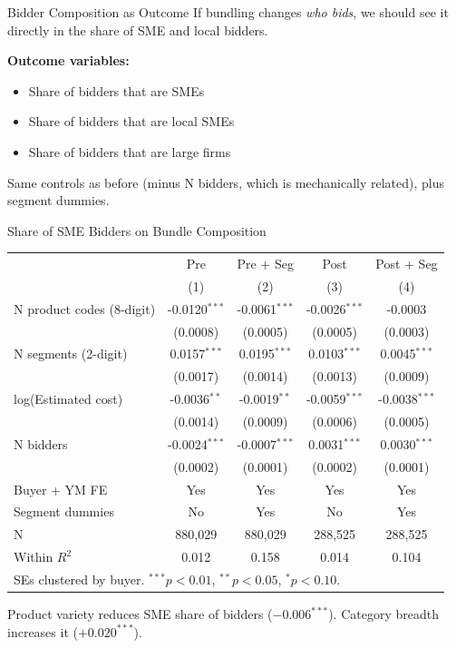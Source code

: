 \documentclass[9pt,aspectratio=169]{beamer}
\begin{document}
\begin{frame}{Bidder Composition as Outcome}
If bundling changes \textit{who bids}, we should see it directly in the share of SME and local bidders.

\bigskip
\textbf{Outcome variables:}
\begin{itemize}
  \item Share of bidders that are SMEs
  \item Share of bidders that are local SMEs
  \item Share of bidders that are large firms
\end{itemize}

\medskip
Same controls as before (minus N bidders, which is mechanically related), plus segment dummies.
\end{frame}

\begin{frame}{Share of SME Bidders on Bundle Composition}
\centering\small
\begin{tabular}{lcccc}
\toprule
 & Pre & Pre + Seg & Post & Post + Seg \\
 & (1) & (2) & (3) & (4) \\
\midrule
N product codes (8-digit) & -0.0120$^{***}$ & -0.0061$^{***}$ & -0.0026$^{***}$ & -0.0003 \\
 & (0.0008) & (0.0005) & (0.0005) & (0.0003) \\[2pt]
N segments (2-digit) & 0.0157$^{***}$ & 0.0195$^{***}$ & 0.0103$^{***}$ & 0.0045$^{***}$ \\
 & (0.0017) & (0.0014) & (0.0013) & (0.0009) \\[2pt]
log(Estimated cost) & -0.0036$^{**}$ & -0.0019$^{**}$ & -0.0059$^{***}$ & -0.0038$^{***}$ \\
 & (0.0014) & (0.0009) & (0.0006) & (0.0005) \\[2pt]
N bidders & -0.0024$^{***}$ & -0.0007$^{***}$ & 0.0031$^{***}$ & 0.0030$^{***}$ \\
 & (0.0002) & (0.0001) & (0.0002) & (0.0001) \\[2pt]
\midrule
Buyer + YM FE & Yes & Yes & Yes & Yes \\
Segment dummies & No & Yes & No & Yes \\
N & 880,029 & 880,029 & 288,525 & 288,525 \\
Within $R^2$ & 0.012 & 0.158 & 0.014 & 0.104 \\
\bottomrule
\multicolumn{5}{l}{\footnotesize SEs clustered by buyer. $^{***}p<0.01$, $^{**}p<0.05$, $^{*}p<0.10$.} \\
\end{tabular}

\medskip
\small Product variety reduces SME share of bidders ($-0.006^{***}$). Category breadth increases it ($+0.020^{***}$).
\end{frame}
\end{document}
